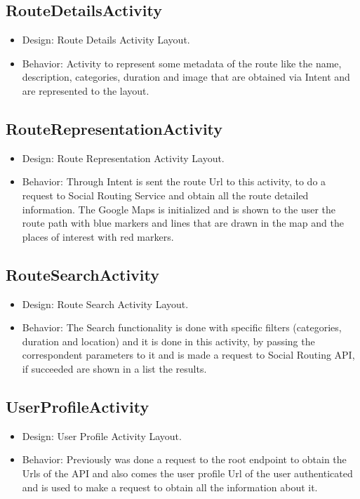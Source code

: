 \subsection*{RouteDetailsActivity}
\begin{itemize}
        \item Design: Route Details Activity Layout.\cite{routedetailsactivitylayout}
        \item Behavior: Activity to represent some metadata of the route like the name, description, categories, duration and image that are obtained via Intent and are represented to the 
        layout.
\end{itemize}

\subsection*{RouteRepresentationActivity} \label{routerepresentationactivity}
\begin{itemize}
        \item Design: Route Representation Activity Layout.\cite{routerepresentationactivitylayout}
        \item Behavior: Through Intent is sent the route Url\cite{url} to this activity, to do a request to Social Routing Service and obtain all the route detailed information. The Google Maps
        is initialized and is shown to the user the route path with blue markers and lines that are drawn in the map and the places of interest with red markers.
\end{itemize}
\newpage

\subsection*{RouteSearchActivity}
\begin{itemize}
        \item Design: Route Search Activity Layout.\cite{routesearchactivitylayout}
        \item Behavior: The Search functionality is done with specific filters (categories, duration and location) and it is done in this activity, by passing the correspondent parameters to it
        and is made a request to Social Routing API, if succeeded are shown in a list the results.
\end{itemize}

\subsection*{UserProfileActivity} \label{userprofileactivity}
\begin{itemize}
        \item Design: User Profile Activity Layout.\cite{userprofilectivitylayout}
        \item Behavior: Previously was done a request to the root endpoint to obtain the Urls of the API and also comes the user profile Url of the user authenticated and is used to make 
a request to obtain all the information about it.
\end{itemize}

